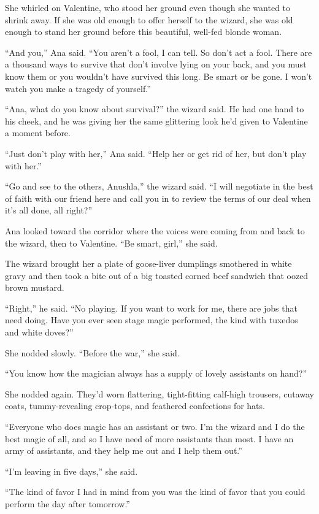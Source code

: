 She whirled on Valentine, who stood her ground even though she
wanted to shrink away. If she was old enough to offer herself to
the wizard, she was old enough to stand her ground before this
beautiful, well-fed blonde woman.

“And you,” Ana said. “You aren’t a fool, I can tell. So don’t act a
fool. There are a thousand ways to survive that don’t involve lying
on your back, and you must know them or you wouldn’t have survived
this long. Be smart or be gone. I won’t watch you make a tragedy of
yourself.”

“Ana, what do you know about survival?” the wizard said. He had one
hand to his cheek, and he was giving her the same glittering look
he’d given to Valentine a moment before.

“Just don’t play with her,” Ana said. “Help her or get rid of her,
but don’t play with her.”

“Go and see to the others, Anushla,” the wizard said. “I will
negotiate in the best of faith with our friend here and call you in
to review the terms of our deal when it’s all done, all right?”

Ana looked toward the corridor where the voices were coming from
and back to the wizard, then to Valentine. “Be smart, girl,” she
said.

The wizard brought her a plate of goose-liver dumplings smothered
in white gravy and then took a bite out of a big toasted corned
beef sandwich that oozed brown mustard.

“Right,” he said. “No playing. If you want to work for me, there
are jobs that need doing. Have you ever seen stage magic performed,
the kind with tuxedos and white doves?”

She nodded slowly. “Before the war,” she said.

“You know how the magician always has a supply of lovely assistants
on hand?”

She nodded again. They’d worn flattering, tight-fitting calf-high
trousers, cutaway coats, tummy-revealing crop-tops, and feathered
confections for hats.

“Everyone who does magic has an assistant or two. I’m the wizard
and I do the best magic of all, and so I have need of more
assistants than most. I have an army of assistants, and they help
me out and I help them out.”

“I’m leaving in five days,” she said.

“The kind of favor I had in mind from you was the kind of favor
that you could perform the day after tomorrow.”

